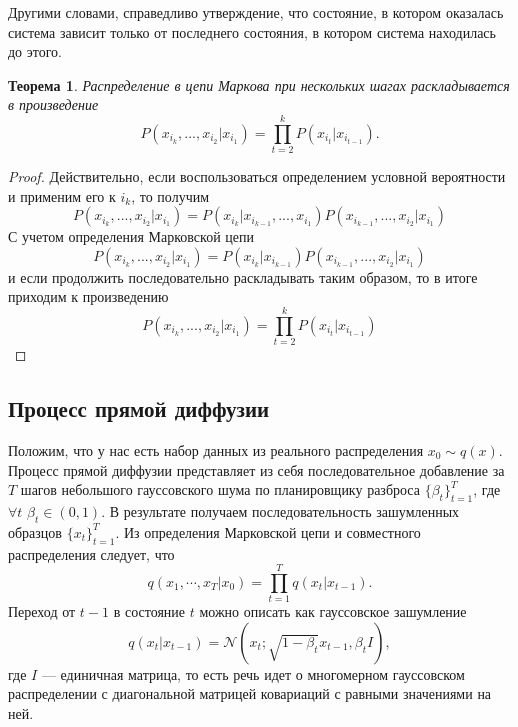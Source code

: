 \documentclass[11pt, a4paper, twocolumn, twoside]{article} %
\newtheorem{theorem}{Теорема}[section]
\begin{document}
Другими словами, справедливо утверждение, что состояние, в котором оказалась система зависит только от последнего состояния, в котором система находилась до этого.

\begin{theorem}
	Распределение в цепи Маркова при нескольких шагах раскладывается в произведение
	\begin{equation}
		P(x_{i_k}, ..., x_{i_2}| x_{i_1}) = \prod_{t=2}^kP(x_{i_t}|x_{i_{t-1}}).
	\end{equation}
\end{theorem}
\begin{proof}
	Действительно, если воспользоваться определением условной вероятности и применим его к $i_k$, то получим
	\begin{equation*}
		P(x_{i_k}, ..., x_{i_2}| x_{i_1}) = P(x_{i_k}|x_{i_{k-1}},...,x_{i_1})P(x_{i_{k-1}},...,x_{i_2}|x_{i_1})
	\end{equation*}
	С учетом определения Марковской цепи
	\begin{equation*}
		P(x_{i_k}, ..., x_{i_2}| x_{i_1}) = P(x_{i_k}|x_{i_{k-1}})P(x_{i_{k-1}},...,x_{i_2}|x_{i_1})
	\end{equation*}
	и если продолжить последовательно раскладывать таким образом, то в итоге приходим к произведению
	\begin{equation*}
		P(x_{i_k}, ..., x_{i_2}| x_{i_1}) = \prod_{t=2}^kP(x_{i_t}|x_{i_{t-1}})
	\end{equation*}
\end{proof}

\subsection{Процесс прямой диффузии}

Положим, что у нас есть набор данных из реального распределения $x_0\sim q(x)$. Процесс прямой диффузии представляет из себя последовательное добавление за $T$ шагов небольшого гауссовского шума по планировщику разброса $\{\beta_t\}_{t=1}^T$, где $\forall t$ $\beta_t\in(0,1)$. В результате получаем последовательность зашумленных образцов $\{x_t\}_{t=1}^T$. Из определения Марковской цепи и совместного распределения следует, что 
\begin{equation}
	q(x_1,\cdots, x_T | x_0) = \prod\limits_{t=1}^Tq(x_t|x_{t-1}).
\end{equation}
Переход от $t-1$ в состояние $t$ можно описать как гауссовское зашумление
\begin{equation}
	q(x_t | x_{t-1}) = \mathcal{N}(x_t; \sqrt{1-\beta_t}x_{t-1},\beta_t I),
\end{equation}
где $I$ — единичная матрица, то есть речь идет о многомерном гауссовском распределении с диагональной матрицей ковариаций с равными значениями на ней. 
\end{document}
